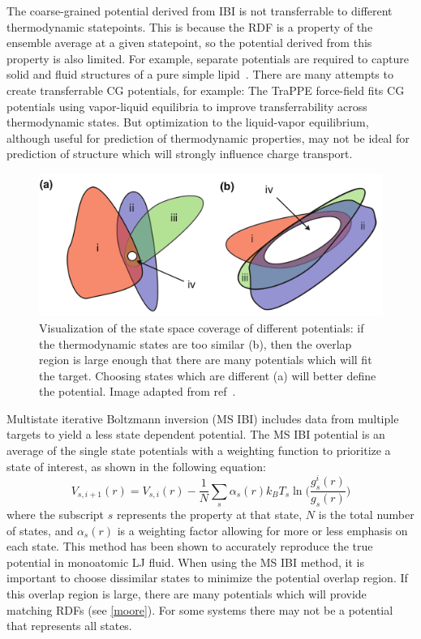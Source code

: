 The coarse-grained potential derived from IBI is not transferrable to different thermodynamic statepoints.
This is because the RDF is a property of the ensemble average at a given statepoint, so the potential derived from this property is also limited.
For example, separate potentials are required to capture solid and fluid structures of a pure simple lipid~\cite{Hadley2010a}.
There are many attempts to create transferrable CG potentials, for example:
The TraPPE force-field fits CG potentials using vapor-liquid equilibria to improve transferrability across thermodynamic states\cite{Maerzke2011}.
But optimization to the liquid-vapor equilibrium, although useful for prediction of thermodynamic properties, may not be ideal for prediction of structure which will strongly influence charge transport.

\begin{figure}
    \centering
    \includegraphics[width=\linewidth]{images/moorefig.pdf}
    \caption{Visualization of the state space coverage of different potentials: if the thermodynamic states are too similar (b), then the overlap region is large enough that there are many potentials which will fit the target. Choosing states which are different (a) will better define the potential. Image adapted from ref~\cite{Moore2014}.}\label{moore}
\end{figure}

Multistate iterative Boltzmann inversion (MS IBI) includes data from multiple targets to yield a less state dependent potential\cite{Moore2014}.
The MS IBI potential is an average of the single state potentials with a weighting function to prioritize a state of interest, as shown in the following equation:
\[
    V_{s,i+1}(r) = V_{s,i}(r) - \frac{1}{N}\sum_{s}\alpha_{s}(r)k_{B}T_{s} \ln\bigg(\frac{g_{s}^{i}(r)}{g_{s}(r)}\bigg)
\]
where the subscript $s$ represents the property at that state, $N$ is the total number of states, and $\alpha_{s}(r)$ is a weighting factor allowing for more or less emphasis on each state.
This method has been shown to accurately reproduce the true potential in monoatomic LJ fluid\cite{Moore2014}.
When using the MS IBI method, it is important to choose dissimilar states to minimize the potential overlap region.
If this overlap region is large, there are many potentials which will provide matching RDFs (see \autoref{moore}).
For some systems there may not be a potential that represents all states.

